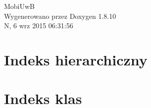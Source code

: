 \documentclass[twoside]{book}
\newcommand{\+}{\discretionary{\mbox{\scriptsize$\hookleftarrow$}}{}{}}
\newcommand{\clearemptydoublepage}{%
  \newpage{\pagestyle{empty}\cleardoublepage}%
}
\begin{document}
\hypersetup{pageanchor=false,
             bookmarks=true,
             bookmarksnumbered=true,
             pdfencoding=unicode
            }
\begin{titlepage}
\vspace*{7cm}
\begin{center}%
{\Large Mobi\+Uw\+B }\\
\vspace*{1cm}
{\large Wygenerowano przez Doxygen 1.8.10}\\
\vspace*{0.5cm}
{\small N, 6 wrz 2015 06:31:56}\\
\end{center}
\end{titlepage}
\clearemptydoublepage
\tableofcontents
\clearemptydoublepage
{}
\hypersetup{pageanchor=true}

\chapter{Indeks hierarchiczny}

\chapter{Indeks klas}

\end{document}
